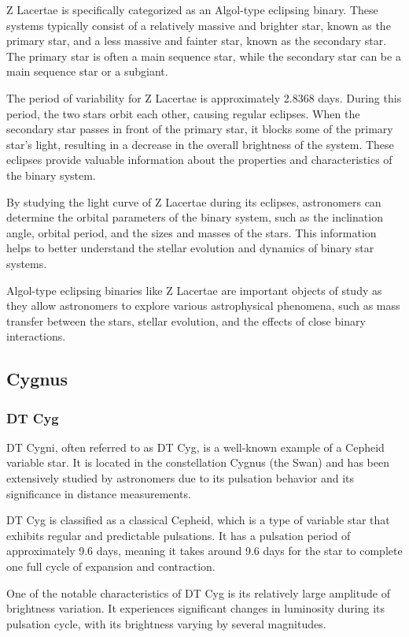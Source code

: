 Z Lacertae is specifically categorized as an Algol-type eclipsing binary. These systems typically consist of a relatively massive and brighter star, known as the primary star, and a less massive and fainter star, known as the secondary star. The primary star is often a main sequence star, while the secondary star can be a main sequence star or a subgiant.

The period of variability for Z Lacertae is approximately 2.8368 days. During this period, the two stars orbit each other, causing regular eclipses. When the secondary star passes in front of the primary star, it blocks some of the primary star's light, resulting in a decrease in the overall brightness of the system. These eclipses provide valuable information about the properties and characteristics of the binary system.

By studying the light curve of Z Lacertae during its eclipses, astronomers can determine the orbital parameters of the binary system, such as the inclination angle, orbital period, and the sizes and masses of the stars. This information helps to better understand the stellar evolution and dynamics of binary star systems.

Algol-type eclipsing binaries like Z Lacertae are important objects of study as they allow astronomers to explore various astrophysical phenomena, such as mass transfer between the stars, stellar evolution, and the effects of close binary interactions.

\subsection{Cygnus}
\subsubsection*{DT Cyg}

DT Cygni, often referred to as DT Cyg, is a well-known example of a Cepheid variable star. It is located in the constellation Cygnus (the Swan) and has been extensively studied by astronomers due to its pulsation behavior and its significance in distance measurements.

DT Cyg is classified as a classical Cepheid, which is a type of variable star that exhibits regular and predictable pulsations. It has a pulsation period of approximately 9.6 days, meaning it takes around 9.6 days for the star to complete one full cycle of expansion and contraction.

One of the notable characteristics of DT Cyg is its relatively large amplitude of brightness variation. It experiences significant changes in luminosity during its pulsation cycle, with its brightness varying by several magnitudes.

